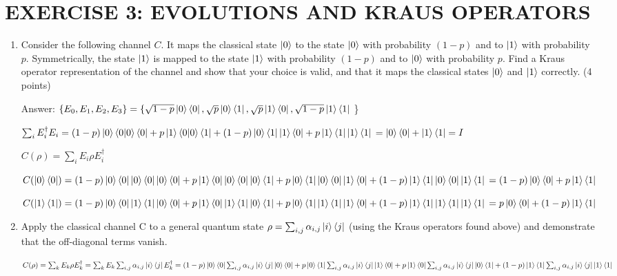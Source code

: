 \documentclass{article}
\begin{document}
\section{EXERCISE 3: EVOLUTIONS AND KRAUS OPERATORS}
\begin{enumerate}
    \item Consider the following channel $C$. It maps the classical state $\ket{0}$ to the state $\ket{0}$ with probability $(1-p)$ and to $\ket{1}$ with probability $p$. Symmetrically, the state $\ket{1}$ is mapped to the state $\ket{1}$ with probability $(1-p)$ and to $\ket{0}$ with probability $p$. Find a Kraus operator representation of the channel and show that your choice is valid, and that it maps the classical states $\ket{0}$ and $\ket{1}$ correctly. (4 points)

          Answer: $\{E_0,E_1,E_2,E_3\}=
              \{
              \sqrt{1-p}\ket{0}\bra{0}, \sqrt{p}\ket{0}\bra{1},\sqrt{p}\ket{1}\bra{0},\sqrt{1-p}\ket{1}\bra{1}$
          \}

          $\sum_i E_i^\dagger E_i=(1-p)\ket{0}\braket{0|0}\bra{0}+p\ket{1}\braket{0|0}\bra{1}+(1-p)\ket{0}\bra{1}\ket{1}\bra{0}+p\ket{1}\bra{1}\ket{1}\bra{1}
              \\=\ket{0}\bra{0}+\ket{1}\bra{1}=I$

          $C(\rho)=\sum_i E_i\rho E_i^\dagger$

          $C(\ket{0}\bra{0})=(1-p)\ket{0}\bra{0}\ket{0}\bra{0}\ket{0}\bra{0}+p\ket{1}\bra{0}\ket{0}\bra{0}\ket{0}\bra{1}+p\ket{0}\bra{1}\ket{0}\bra{0}\ket{1}\bra{0}+(1-p)\ket{1}\bra{1}\ket{0}\bra{0}\ket{1}\bra{1}
              \\=(1-p)\ket{0}\bra{0}+p\ket{1}\bra{1}$

          $C(\ket{1}\bra{1})=(1-p)\ket{0}\bra{0}\ket{1}\bra{1}\ket{0}\bra{0}+p\ket{1}\bra{0}\ket{1}\bra{1}\ket{0}\bra{1}+p\ket{0}\bra{1}\ket{1}\bra{1}\ket{1}\bra{0}+(1-p)\ket{1}\bra{1}\ket{1}\bra{1}\ket{1}\bra{1}
              \\=p\ket{0}\bra{0}+(1-p)\ket{1}\bra{1}$

    \item Apply the classical channel C to a general quantum state $\rho = \sum_{i,j} \alpha_{i,j} \ket{i}\bra{j}$ (using the Kraus operators found above) and demonstrate that the off-diagonal terms vanish.

          $C(\rho)=\sum_k E_k\rho E_k^\dagger
              \\=\sum_k E_k\sum_{i,j} \alpha_{i,j} \ket{i}\bra{j} E_k^\dagger
              \\=(1-p)\ket{0}\bra{0}\sum_{i,j} \alpha_{i,j} \ket{i}\bra{j}\ket{0}\bra{0}+p\ket{0}\bra{1}\sum_{i,j} \alpha_{i,j} \ket{i}\bra{j}\ket{1}\bra{0}+p\ket{1}\bra{0}\sum_{i,j} \alpha_{i,j} \ket{i}\bra{j}\ket{0}\bra{1}+(1-p)\ket{1}\bra{1}\sum_{i,j} \alpha_{i,j} \ket{i}\bra{j}\ket{1}\bra{1}
          $


\end{enumerate}
\end{document}
